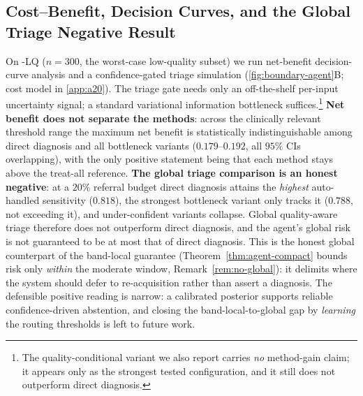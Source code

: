 \subsection{Cost--Benefit, Decision Curves, and the Global Triage Negative Result}
\label{sec:exp-triage}
\label{sec:exp-dca}%
On \itb{}-LQ ($n=300$, the worst-case low-quality subset) we run net-benefit
decision-curve analysis and a confidence-gated triage simulation
(\cref{fig:boundary-agent}B; cost model in \cref{app:a20}). The triage gate needs only an
off-the-shelf per-input uncertainty signal; a standard variational information
bottleneck suffices.\footnote{The quality-conditional variant we also report carries
\emph{no} method-gain claim; it appears only as the strongest tested configuration, and
it still does not outperform direct diagnosis.} \textbf{Net benefit does not separate
the methods}: across the clinically relevant threshold range the maximum net benefit is
statistically indistinguishable among direct diagnosis and all bottleneck variants
($0.179$--$0.192$, all $95\%$ CIs overlapping), with the only positive statement being
that each method stays above the treat-all reference. \textbf{The global triage
comparison is an honest negative}: at a $20\%$ referral budget direct diagnosis attains
the \emph{highest} auto-handled sensitivity ($0.818$), the strongest bottleneck variant
only tracks it ($0.788$, not exceeding it), and under-confident variants collapse.
Global quality-aware triage therefore does not outperform direct diagnosis, and the
agent's global risk is not guaranteed to be at most that of direct diagnosis. This is the
honest global counterpart of the band-local guarantee (Theorem~\ref{thm:agent-compact}
bounds risk only \emph{within} the moderate window, Remark~\ref{rem:no-global}): it
delimits where the system should defer to re-acquisition rather than assert a diagnosis.
The defensible positive reading is narrow: a calibrated posterior supports reliable
confidence-driven abstention, and closing the band-local-to-global gap by \emph{learning}
the routing thresholds is left to future work.
